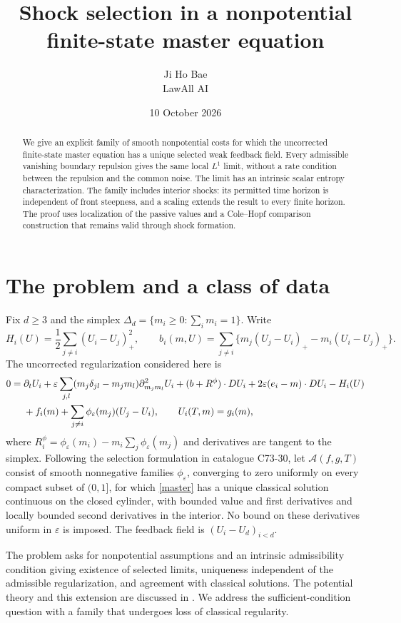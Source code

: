 \documentclass[11pt]{article}
\title{Shock selection in a nonpotential\protect\\ finite-state master equation}
\author{Ji Ho Bae\\\small LawAll AI}
\date{10 October 2026}
\newcommand{\eps}{\varepsilon}
\newcommand{\cA}{\mathcal A}
\begin{document}
\maketitle
\begin{abstract}
We give an explicit family of smooth nonpotential costs for which the uncorrected finite-state master equation has a unique selected weak feedback field. Every admissible vanishing boundary repulsion gives the same local $L^1$ limit, without a rate condition between the repulsion and the common noise. The limit has an intrinsic scalar entropy characterization. The family includes interior shocks: its permitted time horizon is independent of front steepness, and a scaling extends the result to every finite horizon. The proof uses localization of the passive values and a Cole--Hopf comparison construction that remains valid through shock formation.
\end{abstract}

\section{The problem and a class of data}
Fix $d\ge3$ and the simplex $\Delta_d=\{m_i\ge0:\sum_i m_i=1\}$. Write
\[
 H_i(U)=\frac12\sum_{j\ne i}(U_i-U_j)_+^2,\qquad
 b_i(m,U)=\sum_{j\ne i}\{m_j(U_j-U_i)_+-m_i(U_i-U_j)_+\}.
\]
The uncorrected regularization considered here is
\begin{align}\label{master}
0={}&\partial_tU_i+\eps\sum_{j,l}(m_j\delta_{jl}-m_jm_l)\partial^2_{m_jm_l}U_i
 +(b+R^\phi)\cdot DU_i+2\eps(e_i-m)\cdot DU_i-H_i(U)\notag\\
&+f_i(m)+\sum_{j\ne i}\phi_\eps(m_j)(U_j-U_i),\qquad U_i(T,m)=g_i(m),
\end{align}
where $R_i^\phi=\phi_\eps(m_i)-m_i\sum_j\phi_\eps(m_j)$ and derivatives are tangent to the simplex. Following the selection formulation in catalogue C73-30, let $\cA(f,g,T)$ consist of smooth nonnegative families $\phi_\eps$, converging to zero uniformly on every compact subset of $(0,1]$, for which \eqref{master} has a unique classical solution continuous on the closed cylinder, with bounded value and first derivatives and locally bounded second derivatives in the interior. No bound on these derivatives uniform in $\eps$ is imposed. The feedback field is $(U_i-U_d)_{i<d}$.

The problem asks for nonpotential assumptions and an intrinsic admissibility condition giving existence of selected limits, uniqueness independent of the admissible regularization, and agreement with classical solutions. The potential theory and this extension are discussed in \cite[\S4.3--4.4]{CD}. We address the sufficient-condition question with a family that undergoes loss of classical regularity.
\end{document}
